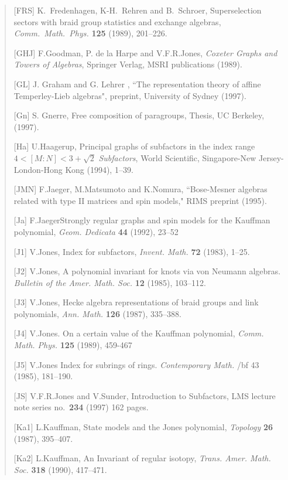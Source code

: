 \begin{verse}
[FRS] K.~Fredenhagen, K-H.~Rehren and B.~Schroer,
Superselection sectors with braid group statistics and exchange
algebras, {\it Comm.~Math.~Phys.} {\bf 125} (1989), 201--226.



[GHJ] F.Goodman, P. de la Harpe and V.F.R.Jones, {\it
Coxeter Graphs and  Towers of Algebras}, Springer Verlag, MSRI
publications (1989).



[GL] J. Graham and G. Lehrer , ``The representation theory
of affine Temperley-Lieb algebras", preprint, University of Sydney
(1997).

[Gn] S. Gnerre, Free composition of paragroups,
Thesis, UC Berkeley, (1997).

[Ha] U.Haagerup,
Principal graphs of subfactors in the index range $4 < [M:N] <
3 + \sqrt{2}$
{\it Subfactors}, World Scientific, Singapore-New
Jersey-London-Hong Kong (1994), 1--39.



[JMN] F.Jaeger, M.Matsumoto and  K.Nomura, ``Bose-Mesner
algebras related with type  II matrices and spin models," RIMS
preprint (1995).

[Ja] F.JaegerStrongly regular graphs and spin models for the Kauffman polynomial, 
{\it Geom. Dedicata } {\bf 44} (1992), 23--52 


[J1] V.Jones,  Index for subfactors, {\it Invent.
Math.} {\bf 72}  (1983), 1--25.


[J2]  V.Jones, A polynomial invariant for knots via
von Neumann algebras.
       {\it Bulletin of the Amer. Math. Soc.} {\bf 12} (1985),
103--112.


[J3] V.Jones,  Hecke algebra representations of
braid groups and link polynomials, {\it Ann. Math.} {\bf 126}
(1987), 335--388.

[J4] V.Jones. On a certain value of the Kauffman polynomial,
{\it Comm. Math. Phys.} {\bf 125} (1989), 459-467

[J5] V.Jones Index for subrings of rings.
{\it Contemporary Math.} {/bf 43} (1985), 181--190.


[JS] V.F.R.Jones and V.Sunder, Introduction to
Subfactors, LMS lecture note
        series no.~{\bf 234} (1997) 162 pages.


[Ka1] L.Kauffman,
 State models and the Jones polynomial, {\it Topology} {\bf 26}
(1987), 395--407.

[Ka2] L.Kauffman,
An Invariant of regular isotopy, {\it Trans. Amer. Math. Soc.}
{\bf 318} (1990), 417--471.


\end{verse}
